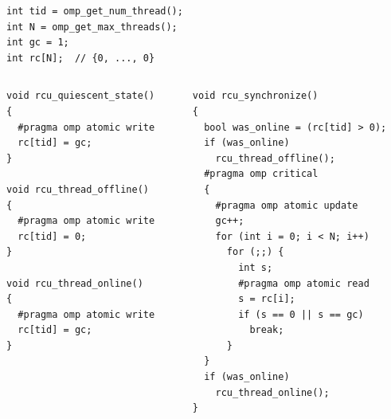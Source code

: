 \documentclass[xcolor={x11names,svgnames},x11names,svgnames]{beamer}
\begin{document}
\begin{frame}[label=rcu]
\end{frame}


\begin{frame}[fragile=singleslide,label=rcu]
\begin{verbatim}
int tid = omp_get_num_thread();
int N = omp_get_max_threads();
int gc = 1;                      
int rc[N];  // {0, ..., 0} 
\end{verbatim}

\begin{columns}[T]
\begin{column}{0.4\textwidth}
  \vspace*{-1ex}
  \begin{verbatim}
void rcu_quiescent_state()
{
  #pragma omp atomic write
  rc[tid] = gc;
}

void rcu_thread_offline()
{
  #pragma omp atomic write
  rc[tid] = 0;
}

void rcu_thread_online()
{
  #pragma omp atomic write
  rc[tid] = gc;
}
\end{verbatim}
\end{column}

\begin{column}{0.5\textwidth}
  \vspace*{-1ex}
\begin{verbatim}
void rcu_synchronize()
{
  bool was_online = (rc[tid] > 0);
  if (was_online)
    rcu_thread_offline();
  #pragma omp critical
  {
    #pragma omp atomic update
    gc++;
    for (int i = 0; i < N; i++)
      for (;;) {
        int s;
        #pragma omp atomic read
        s = rc[i];
        if (s == 0 || s == gc)
          break;
      }
  }
  if (was_online)
    rcu_thread_online();
}
\end{verbatim}
\end{column}
\end{columns}
\end{frame}
\end{document}
